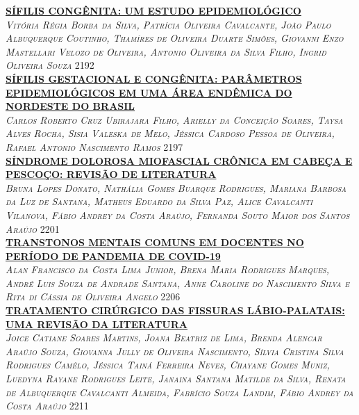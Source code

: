 \noindent \textsc{\hyperlink{trabalhos/249970.pdf.1}{\textbf{SÍFILIS CONGÊNITA: UM ESTUDO EPIDEMIOLÓGICO }}}\\ 
\noindent \textsc{\textit{Vitória Régia Borba da Silva, Patrícia Oliveira Cavalcante, João Paulo Albuquerque Coutinho, Thamíres de Oliveira Duarte Simões, Giovanni Enzo Mastellari Velozo de Oliveira, Antonio Oliveira da Silva Filho, Ingrid Oliveira Souza}} \hfill 2192\\ 

\noindent \textsc{\hyperlink{trabalhos/250371.pdf.1}{\textbf{SÍFILIS GESTACIONAL E CONGÊNITA: PARÂMETROS  EPIDEMIOLÓGICOS EM UMA ÁREA ENDÊMICA DO NORDESTE DO BRASIL}}}\\ 
\noindent \textsc{\textit{Carlos Roberto Cruz Ubirajara Filho, Arielly da Conceição Soares, Taysa Alves Rocha, Sisia Valeska de Melo, Jéssica Cardoso Pessoa de Oliveira, Rafael Antonio Nascimento Ramos}} \hfill 2197\\ 

\noindent \textsc{\hyperlink{trabalhos/247774.pdf.1}{\textbf{SÍNDROME DOLOROSA MIOFASCIAL CRÔNICA EM CABEÇA E PESCOÇO: REVISÃO DE LITERATURA}}}\\ 
\noindent \textsc{\textit{Bruna Lopes Donato, Nathália Gomes Buarque Rodrigues, Mariana Barbosa da Luz de Santana, Matheus Eduardo da Silva Paz, Alice Cavalcanti Vilanova, Fábio Andrey da Costa Araújo, Fernanda Souto Maior dos Santos Araújo}} \hfill 2201\\ 

\noindent \textsc{\hyperlink{trabalhos/251843.pdf.1}{\textbf{TRANSTONOS MENTAIS COMUNS EM DOCENTES NO PERÍODO DE PANDEMIA DE COVID-19}}}\\ 
\noindent \textsc{\textit{Alan Francisco da Costa Lima Junior, Brena Maria Rodrigues Marques, André Luis Souza de Andrade Santana, Anne Caroline do Nascimento Silva e Rita di Cássia de Oliveira Angelo}} \hfill 2206\\ 

\noindent \textsc{\hyperlink{trabalhos/248920.pdf.1}{\textbf{TRATAMENTO CIRÚRGICO DAS FISSURAS LÁBIO-PALATAIS: UMA REVISÃO DA LITERATURA}}}\\ 
\noindent \textsc{\textit{Joice Catiane Soares Martins, Joana Beatriz de Lima, Brenda Alencar Araújo Souza, Giovanna Jully de Oliveira Nascimento, Sílvia Cristina Silva Rodrigues Camêlo, Jéssica Tainá Ferreira Neves, Chayane Gomes Muniz, Luedyna Rayane Rodrigues Leite, Janaina Santana Matilde da Silva, Renata de Albuquerque Cavalcanti Almeida, Fabrício Souza Landim, Fábio Andrey da Costa Araújo}} \hfill 2211\\ 

